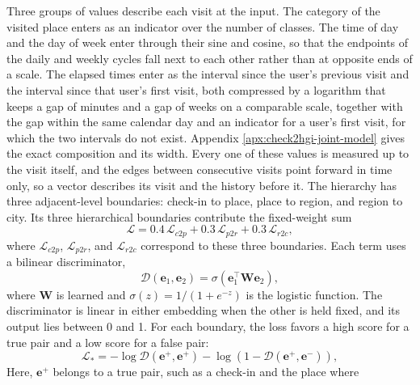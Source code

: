 Three groups of values describe each visit at the input. The category of the visited place enters as
an indicator over the number of classes. The time of day and the day of week enter through their sine and
cosine, so that the endpoints of the daily and weekly cycles fall next to each other rather than at
opposite ends of a scale. The elapsed times enter as the interval since the user's previous visit and
the interval since that user's first visit, both compressed by a logarithm that keeps a gap of
minutes and a gap of weeks on a comparable scale, together with the gap within the same calendar day
and an indicator for a user's first visit, for which the two intervals do not exist. Appendix
\ref{apx:check2hgi-joint-model} gives the exact composition and its width. Every one of these values
is measured up to the visit itself, and the edges between consecutive visits point forward in time
only, so a vector describes its visit and the history before it. The hierarchy has
three adjacent-level boundaries: check-in to place, place to region, and region to
city. Its three hierarchical boundaries contribute the fixed-weight sum
\begin{equation}\label{eq:fund:check2hgi}
    \mathcal{L} = 0.4\,\mathcal{L}_{c2p} + 0.3\,\mathcal{L}_{p2r} + 0.3\,\mathcal{L}_{r2c},
\end{equation}
where $\mathcal{L}_{c2p}$, $\mathcal{L}_{p2r}$, and $\mathcal{L}_{r2c}$ correspond
to these three boundaries. Each term uses a bilinear discriminator,
\begin{equation}\label{eq:fund:check2hgi-disc}
    \mathcal{D}(\mathbf{e}_1, \mathbf{e}_2) = \sigma(\mathbf{e}_1^{\top}\mathbf{W}\mathbf{e}_2),
\end{equation}
where $\mathbf{W}$ is learned and
$\sigma(z)=1/(1+e^{-z})$ is the logistic function. The discriminator is linear in
either embedding when the other is held fixed, and its output lies between 0 and 1.
For each boundary, the loss favors a high score for a true pair and a low score for a
false pair:
\begin{equation}\label{eq:fund:check2hgi-term}
    \mathcal{L}_{*} = -\log \mathcal{D}(\mathbf{e}^{+}, \mathbf{e}^{+})
    - \log\left(1 - \mathcal{D}(\mathbf{e}^{+}, \mathbf{e}^{-})\right),
\end{equation}
Here, $\mathbf{e}^{+}$ belongs to a true pair, such as a check-in and the place where
